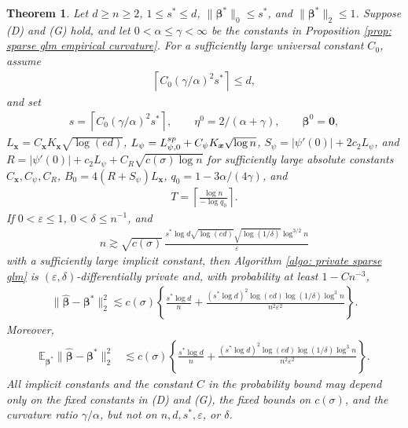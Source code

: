 \documentclass[letterpaper,12pt]{article}
\numberwithin{equation}{section}
\theoremstyle{plain}
\newtheorem{Theorem}{Theorem}
\numberwithin{Theorem}{section}
\numberwithin{proposition}{section}
\numberwithin{Lemma}{section}
{
	\theoremstyle{definition}
	\newtheorem{Definition}{Definition}
	\newtheorem{example}{Example}
	\numberwithin{example}{section}
	\newtheorem{fact}{Fact}
	\numberwithin{fact}{section}
	\newtheorem{remark}{Remark}
}
\newcommand{\furtherrev}[1]{#1}
\newcommand{\1}{\mathbbm{1}}
\def\bbeta{{\boldsymbol{\beta}}}
\def\E{\mathbb{E}}
\begin{document}
\begin{Theorem}\label{thm: glm upper bound}
		Let $d\geq n\geq2$, $1\leq s^*\leq d$, $\|\bbeta^*\|_0\leq s^*$, and $\|\bbeta^*\|_2\leq1$.  Suppose (D) and (G) hold, and let $0<\alpha\leq\gamma<\infty$ be the constants in Proposition \ref{prop: sparse glm empirical curvature}.  For a sufficiently large
		universal constant $C_0$, assume
	\begin{align*}
		\left\lceil C_0(\gamma/\alpha)^2s^*\right\rceil\leq d,
	\end{align*}
	and set
	\begin{align*}
		s=\left\lceil C_0(\gamma/\alpha)^2s^*\right\rceil,
		\qquad
		\eta^0=2/(\alpha+\gamma),\qquad
		\bbeta^0=\bm0,
	\end{align*}
	$L_{\bm x}=C_{\bm x}K_{\bm x}\sqrt{\log(ed)}$,
	$L_\psi=L_{\psi,0}^{\rm sp}+C_\psi K_{\bm x}\sqrt{\log n}$,
	$S_\psi=|\psi'(0)|+2c_2L_\psi$, and
	$R=|\psi'(0)|+c_2L_\psi+C_R\sqrt{c(\sigma)\log n}$
	for sufficiently large absolute constants $C_{\bm x},C_\psi,C_R$,
	$B_0=4(R+S_\psi)L_{\bm x}$, \furtherrev{$q_0=1-3\alpha/(4\gamma)$, and
	\begin{align*}
		T=\left\lceil\frac{\log n}{-\log q_0}\right\rceil.
	\end{align*}}
	If $0<\varepsilon\leq1$, $0<\delta\leq n^{-1}$, and
	\begin{align*}
		n\gtrsim \sqrt{c(\sigma)}\,
		\frac{s^*\log d\sqrt{\log(ed)}
		\sqrt{\log(1/\delta)}\log^{3/2}n}{\varepsilon}
	\end{align*}
			with a sufficiently large implicit constant, then Algorithm \ref{algo: private sparse glm} is $(\varepsilon,\delta)$-differentially private and, with probability at least $1-Cn^{-3}$,
		\begin{align}
			\|\widehat\bbeta-\bbeta^*\|_2^2
		\lesssim c(\sigma)\left\{
		\frac{s^*\log d}{n}
		+\frac{(s^*\log d)^2\log(ed)
		\log(1/\delta)\log^3n}{n^2\varepsilon^2}
			\right\}.                                             \label{eq: glm upper bound}
		\end{align}
		Moreover,
		\begin{align}
		\E_{\bbeta^*}\|\widehat\bbeta-\bbeta^*\|_2^2
		&\lesssim c(\sigma)\left\{
		\frac{s^*\log d}{n}
		+\frac{(s^*\log d)^2\log(ed)
		\log(1/\delta)\log^3n}{n^2\varepsilon^2}
			\right\}.                                                \label{eq: sparse glm expected upper bound}
			\end{align}
		\furtherrev{All implicit constants and the constant $C$ in the probability bound may depend only on the fixed constants in (D) and (G), the fixed bounds on $c(\sigma)$, and the curvature ratio $\gamma/\alpha$, but not on $n,d,s^*,\varepsilon$, or $\delta$.}
\end{Theorem}
\end{document}
